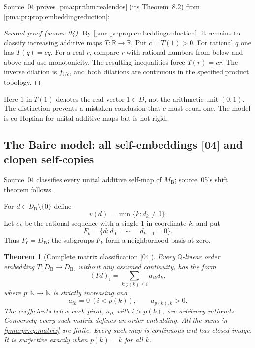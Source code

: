 \documentclass[11pt]{article}
\numberwithin{equation}{section}
\newtheorem{theorem}{Theorem}[section]
\theoremstyle{definition}
\theoremstyle{remark}
\newcommand{\N}{\mathbb N}
\newcommand{\Q}{\mathbb Q}
\newcommand{\R}{\mathbb R}
\newcommand{\MB}{M_{\mathrm B}}
\newcommand{\src}[1]{\textup{\textsf{\small[#1]}}}
\begin{document}
Source~04 proves \cref{pma:pr:thm:realendos} (its Theorem~8.2) from
\cref{pma:pr:prop:embeddingreduction}:

\begin{proof}[Second proof (source 04)]
By \cref{pma:pr:prop:embeddingreduction}, it remains to classify increasing
additive maps $T:\R\to\R$. Put $c=T(1)>0$. For rational $q$ one has
$T(q)=cq$. For a real $r$, compare $r$ with rational numbers from below
and above and use monotonicity. The resulting inequalities force
$T(r)=cr$. The inverse dilation is $f_{1/c}$, and both dilations are
continuous in the specified product topology.
\end{proof}

Here $1$ in $T(1)$ denotes the real vector $1\in D$, not the arithmetic
unit $(0,1)$. The distinction prevents a mistaken conclusion that $c$
must equal one. The model is co-Hopfian for unital additive maps but is
not rigid.

\subsection{The Baire model: all self-embeddings \src{04} and clopen self-copies}\label{pma:pr:sec:bairemaps}

Source~04 classifies every unital additive self-map of $\MB$; source~05's
shift theorem follows.

For $d\in D_{\mathrm B}\setminus\{0\}$ define
\[
 v(d)=\min\{k:d_k\ne0\}.
\]
Let $e_k$ be the rational sequence with a single $1$ in coordinate $k$,
and put
\[
 F_k=\{d:d_0=\cdots=d_{k-1}=0\}.
\]
Thus $F_0=D_{\mathrm B}$; the subgroups $F_k$ form a neighborhood basis at zero.

\begin{theorem}[Complete matrix classification \src{04}]\label{pma:pr:thm:matrices}
Every $\Q$-linear order embedding $T:D_{\mathrm B}\to D_{\mathrm B}$, without any
assumed continuity, has the form
\begin{equation}\label{pma:pr:eq:matrix}
 (Td)_i=\sum_{k:p(k)\leq i}a_{ik}d_k,
\end{equation}
where $p:\N\to\N$ is strictly increasing and
\begin{equation}\label{pma:pr:eq:pivotconditions}
 a_{ik}=0\ (i<p(k)),\qquad a_{p(k),k}>0.
\end{equation}
The coefficients below each pivot, $a_{ik}$ with $i>p(k)$, are arbitrary
rationals. Conversely every such matrix defines an order embedding.
All the sums in \eqref{pma:pr:eq:matrix} are finite. Every such map is continuous
and has closed image. It is surjective exactly when $p(k)=k$ for all $k$.
\end{theorem}
\end{document}
